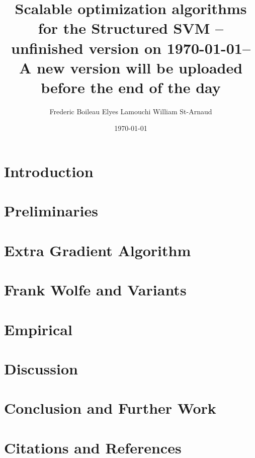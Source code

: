 

\usepackage[
  backend=biber,
  citestyle=authoryear-ibid,
  natbib=true
  ]{biblatex}
\usepackage{csquotes}
\usepackage{comment}
\usepackage{fancyhdr}
\pagestyle{fancyplain}
\fancyhf{}
\rhead{ \fancyplain{}{\today} }
\rfoot{ \fancyplain{}{\thepage} }

\renewcommand\nameyeardelim{, }



\usepackage[toc,page]{appendix}

\title{Scalable optimization algorithms for the Structured SVM -- unfinished
  version on \today  -- A new version will be uploaded before the end of the day}
\date{\today}
\author{Frederic Boileau Elyes Lamouchi William St-Arnaud}

\maketitle

\tableofcontents
\clearpage
\section{Introduction}



\clearpage
\section{Preliminaries}

% 


\clearpage
\section{Extra Gradient Algorithm}


\clearpage
\section{Frank Wolfe and Variants}


\clearpage
\section{Empirical}


\clearpage
\section{Discussion}


\clearpage
\section{Conclusion and Further Work}


\clearpage
\section{Citations and References}
\printbibliography

\clearpage
\begin{appendices}

\clearpage


\clearpage


\clearpage
\end{appendices}


